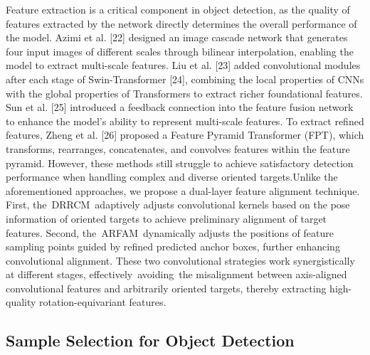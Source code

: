 \documentclass[journal]{IEEEtran}
\begin{document}
Feature extraction is a critical component in object detection, as the quality of features extracted by the network directly determines the overall performance of the model. Azimi et al. [22] designed an image cascade network that generates four input images of different scales through bilinear interpolation, enabling the model to extract multi-scale features. Liu et al. [23] added convolutional modules after each stage of Swin-Transformer [24], combining the local properties of CNNs with the global properties of Transformers to extract richer foundational features. Sun et al. [25] introduced a feedback connection into the feature fusion network to enhance the model's ability to represent multi-scale features. To extract refined features, Zheng et al. [26] proposed a Feature Pyramid Transformer (FPT), which transforms, rearranges, concatenates, and convolves features within the feature pyramid. However, these methods still struggle to achieve satisfactory detection performance when handling complex and diverse oriented targets.Unlike the aforementioned approaches, we propose a dual-layer feature alignment technique. First, the DRRCM adaptively adjusts convolutional kernels based on the pose information of oriented targets to achieve preliminary alignment of target features. Second, the ARFAM dynamically adjusts the positions of feature sampling points guided by refined predicted anchor boxes, further enhancing convolutional alignment. These two convolutional strategies work synergistically at different stages, effectively avoiding the misalignment between axis-aligned convolutional features and arbitrarily oriented targets, thereby extracting high-quality rotation-equivariant features.

\subsection{ Sample Selection for Object Detection }
\end{document}

